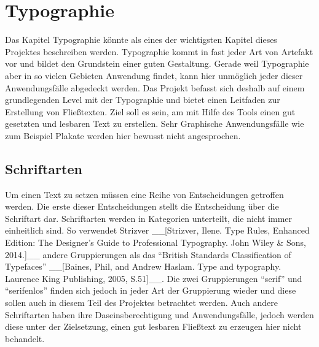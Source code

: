 

\newcommand{\chaptertitle}{Typographie}

\chapter{\chaptertitle} %

\label{Typographie} %

\lhead{\chaptername{} \thechapter{} - \emph{\chaptertitle}} %


Das Kapitel Typographie könnte als eines der wichtigsten Kapitel dieses Projektes beschreiben werden. Typographie kommt in fast jeder Art von Artefakt vor und bildet den Grundstein einer guten Gestaltung. Gerade weil Typographie aber in so vielen Gebieten Anwendung findet, kann hier unmöglich jeder dieser Anwendungsfälle abgedeckt werden.
Das Projekt befasst sich deshalb auf einem grundlegenden Level mit der Typographie und bietet einen Leitfaden zur Erstellung von Fließtexten. Ziel soll es sein, am mit Hilfe des Tools einen gut gesetzten und lesbaren Text zu erstellen.
Sehr Graphische Anwendungsfälle wie zum Beispiel Plakate werden hier bewusst nicht angesprochen.

\section{Schriftarten}
Um einen Text zu setzen müssen eine Reihe von Entscheidungen getroffen werden. Die erste dieser Entscheidungen stellt die Entscheidung über die Schriftart dar.
Schriftarten werden in Kategorien unterteilt, die nicht immer einheitlich sind. So verwendet Strizver __[Strizver, Ilene. Type Rules, Enhanced Edition: The Designer's Guide to Professional Typography. John Wiley & Sons, 2014.]__ andere Gruppierungen als  das “British Standards Classification of Typefaces” __[Baines, Phil, and Andrew Haslam. Type and typography. Laurence King Publishing, 2005, S.51]__. Die zwei Gruppierungen “serif” und “serifenlos” finden sich jedoch in jeder Art der Gruppierung wieder und diese sollen auch in diesem Teil des Projektes betrachtet werden.
Auch andere Schriftarten haben ihre Daseinsberechtigung und Anwendungsfälle, jedoch werden diese unter der Zielsetzung, einen gut lesbaren Fließtext zu erzeugen hier nicht behandelt.

